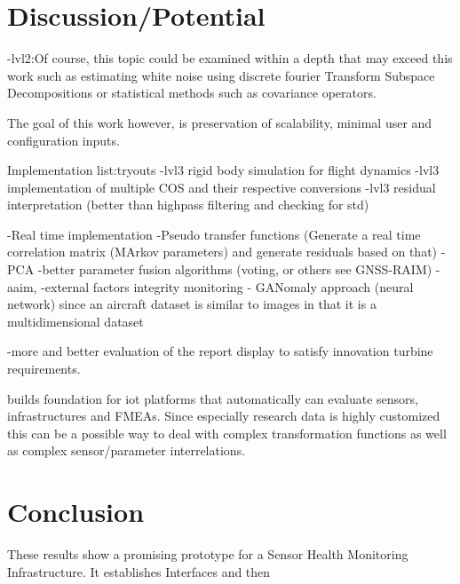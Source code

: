 \section{Discussion/Potential}

-lvl2:Of course, this topic could be examined within a depth that may exceed this work such as estimating white noise using discrete fourier Transform Subspace Decompositions \cite{hendriks_noise_2008} or statistical methods such as covariance operators.

The goal of this work however, is preservation of scalability, minimal user and configuration inputs.

Implementation list:tryouts
-lvl3 rigid body simulation for flight dynamics
-lvl3 implementation of multiple COS and their respective conversions
-lvl3 residual interpretation (better than highpass filtering and checking for std)

-Real time implementation
-Pseudo transfer functions (Generate a real time correlation matrix (MArkov parameters) and generate residuals based on that)
-PCA
-better parameter fusion algorithms (voting, or others see GNSS-RAIM)
        -aaim,
        -external factors integrity monitoring
- GANomaly approach (neural network) since an aircraft dataset is similar to images in that it is a multidimensional dataset

-more and better evaluation of the report display to satisfy innovation turbine requirements.


builds foundation for iot platforms that automatically can evaluate sensors, infrastructures and FMEAs. Since especially research data is highly customized this can be a possible way to deal with complex transformation functions as well as complex sensor/parameter interrelations.

\section{Conclusion}

These results show a promising prototype for a Sensor Health Monitoring Infrastructure. It establishes Interfaces and then
